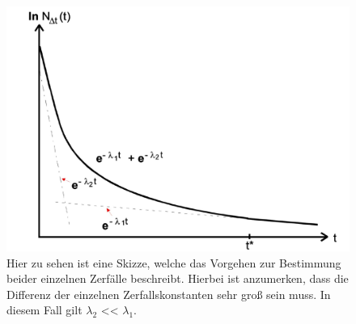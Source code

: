 \begin{figure}
    \centering
    \includegraphics[scale = 0.4]{content/Zerfall.pdf}
    \caption{Hier zu sehen ist eine Skizze, welche das Vorgehen zur Bestimmung beider einzelnen Zerfälle beschreibt. Hierbei ist anzumerken, dass die Differenz der einzelnen Zerfallskonstanten sehr groß sein muss. In diesem Fall gilt \(\lambda_2\) << \(\lambda_1\).}
    \label{fig:zerfall}
\end{figure}


